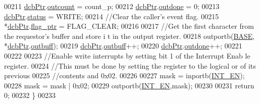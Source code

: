 \begin{DoxyCode}
00211                 \hyperlink{_m_p_x___r5_8h_acf6724d515070007ff4ac39c32640311}{dcbPtr}.\hyperlink{structdevice_ae597c46dee282a47174100b12525b424}{outcount} = count\_p; 
00212                 \hyperlink{_m_p_x___r5_8h_acf6724d515070007ff4ac39c32640311}{dcbPtr}.\hyperlink{structdevice_ab7c43127bcb340d678131fd04c37ba05}{outdone} = 0; 
00213                 \hyperlink{_m_p_x___r5_8h_acf6724d515070007ff4ac39c32640311}{dcbPtr}.\hyperlink{structdevice_aaaefcdae0117d89bef5340a1e3f432e1}{status} = WRITE;
00214                 \textcolor{comment}{//Clear the caller's event flag. }
00215                 *\hyperlink{_m_p_x___r5_8h_acf6724d515070007ff4ac39c32640311}{dcbPtr}.\hyperlink{structdevice_aa14e67b7bd4e2bc5751268f0be91983f}{flag_ptr} = FLAG\_CLEAR; 
00216                 
00217                 \textcolor{comment}{//Get the first character from the requestor's buffer and store i
      t in the output register. }
00218                 outportb(\hyperlink{_m_p_x___r5_8h_a79bcfb6bde984f42d1124b068a509af7}{BASE}, *\hyperlink{_m_p_x___r5_8h_acf6724d515070007ff4ac39c32640311}{dcbPtr}.\hyperlink{structdevice_a32acea82810b51d93df2d3ced6cdffb7}{outbuff}); 
00219                 \hyperlink{_m_p_x___r5_8h_acf6724d515070007ff4ac39c32640311}{dcbPtr}.\hyperlink{structdevice_a32acea82810b51d93df2d3ced6cdffb7}{outbuff}++; 
00220                 \hyperlink{_m_p_x___r5_8h_acf6724d515070007ff4ac39c32640311}{dcbPtr}.\hyperlink{structdevice_ab7c43127bcb340d678131fd04c37ba05}{outdone}++; 
00221          
00222                  
00223                  \textcolor{comment}{//Enable write interrupts by setting bit 1 of the Interrupt Enab
      le register. }
00224                  \textcolor{comment}{//This must be done by setting the register to the logical or of
       its previous }
00225                  \textcolor{comment}{//contents and 0x02. }
00226 
00227                 mask = inportb(\hyperlink{_m_p_x___r5_8h_a8dc8a6ba32861f0a3cbd89fa1ec0d216}{INT_EN}); 
00228                 mask = mask | 0x02; 
00229                 outportb(\hyperlink{_m_p_x___r5_8h_a8dc8a6ba32861f0a3cbd89fa1ec0d216}{INT_EN},mask); 
00230     
00231         \textcolor{keywordflow}{return} 0; 
00232         \}
00233 
\end{DoxyCode}
